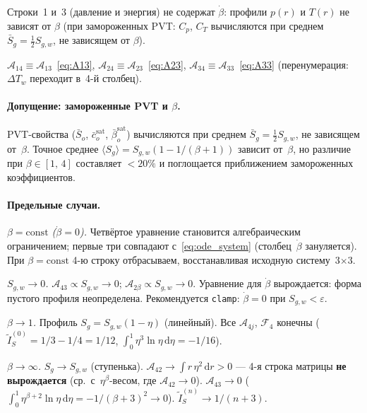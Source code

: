 \documentclass[12pt,a4paper]{article}
\newcommand{\dd}{\mathrm{d}}
\newcommand{\sat}{\mathrm{sat}}
\begin{document}
Строки~1 и~3 (давление и энергия) не содержат $\dot\beta$:
профили $p(r)$ и $T(r)$ не зависят от $\beta$
(при замороженных PVT: $C_p$, $C_T$ вычисляются
при среднем $\bar{S}_g = \tfrac{1}{2}S_{g,w}$,
не зависящем от $\beta$).

$\mathcal{A}_{14} \equiv \mathcal{A}_{13}$~\eqref{eq:A13},
$\mathcal{A}_{24} \equiv \mathcal{A}_{23}$~\eqref{eq:A23},
$\mathcal{A}_{34} \equiv \mathcal{A}_{33}$~\eqref{eq:A33}
(перенумерация: $\Delta T_w$ переходит в~4-й столбец).

\paragraph{Допущение: замороженные PVT и $\beta$.}
PVT-свойства ($\bar{S}_o$, $\bar{c}_o^\sat$,
$\bar\beta_o^\sat$) вычисляются при среднем
$\bar{S}_g = \tfrac{1}{2}S_{g,w}$, не зависящем от~$\beta$.
Точное среднее $\langle S_g\rangle = S_{g,w}(1 - 1/(\beta{+}1))$
зависит от~$\beta$, но различие при $\beta \in [1,\,4]$
составляет $< 20\%$ и поглощается приближением
замороженных коэффициентов.

\paragraph{Предельные случаи.}

\emph{$\beta = \mathrm{const}$ ($\dot\beta = 0$).}
Четвёртое уравнение становится алгебраическим ограничением;
первые три совпадают с~\eqref{eq:ode_system}
(столбец~$\dot\beta$ зануляется).
При $\beta = \mathrm{const}$ 4-ю строку отбрасываем,
восстанавливая исходную систему~3$\times$3.

\emph{$S_{g,w} \to 0$.}
$\mathcal{A}_{43} \propto S_{g,w} \to 0$;
$\mathcal{A}_{2\beta} \propto S_{g,w} \to 0$.
Уравнение для $\dot\beta$ вырождается:
форма пустого профиля неопределена.
Рекомендуется \verb|clamp|: $\dot\beta = 0$
при $S_{g,w} < \varepsilon$.

\emph{$\beta \to 1$.}
Профиль $S_g = S_{g,w}(1-\eta)$ (линейный).
Все $\mathcal{A}_{4j}$, $\mathcal{F}_4$ конечны
($\widetilde{I}_S^{(0)} = 1/3 - 1/4 = 1/12$,
$\int_0^1\eta^{3}\ln\eta\,\dd\eta = -1/16$).

\emph{$\beta \to \infty$.}
$S_g \to S_{g,w}$ (ступенька).
$\mathcal{A}_{42} \to \int r\,\eta^2\,\dd r > 0$
--- 4-я строка матрицы \textbf{не вырождается}
(ср.\ с~$\eta^\beta$-весом, где $\mathcal{A}_{42} \to 0$).
$\mathcal{A}_{43} \to 0$
($\int_0^1\eta^{\beta+2}\ln\eta\,\dd\eta
= -1/(\beta{+}3)^2 \to 0$).
$\widetilde{I}_S^{(n)} \to 1/(n{+}3)$.
\end{document}

